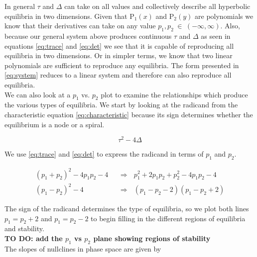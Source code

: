 \documentclass{article}
\begin{document}
In general $\tau$ and $\Delta$ can take on all values and collectively
describe all hyperbolic equilibria in two dimensions. Given that $\text{P}_1(x)$ and
$\text{P}_2(y)$ are polynomials we know that their derivatives can take on any
value $p_1,p_2 \hspace{3pt} \in \hspace{3pt} (-\infty,\infty)$. Also,
because our general system above produces continuous $\tau$ and
$\Delta$ as seen in equations \ref{eq:trace} and \ref{eq:det}  we see that it is capable of reproducing all equilibria in two
dimensions. Or in simpler terms, we know that two linear polynomials are sufficient to
reproduce any equilibria. The form presented in \ref{eq:system} reduces to a
linear system and therefore can also reproduce all equilibria. \\

We can also look at a $p_1$ vs. $p_2$ plot to examine the relationships which
produce the various types of equilibria. We start by looking at the radicand
from the characteristic equation \ref{eq:characteristic} because its sign
determines whether the equilibrium is a node or a spiral.

\begin{equation}
    \tau^2-4\Delta \label{eq:radicand}
\end{equation}

\noindent We use \ref{eq:trace} and \ref{eq:det} to express the radicand in terms of $p_1$
and $p_2$.

\begin{align}
    (p_1+p_2)^2-4p_1p_2-4 \hspace{8pt} 
    & \Rightarrow \hspace{8pt} p_1^2+2p_1p_2+p_2^2-4p_1p_2-4 \nonumber \\
    (p_1-p_2)^2-4 \hspace{8pt} & \Rightarrow \hspace{8pt} 
    (p_1-p_2-2)(p_1-p_2+2) \nonumber
\end{align}

\noindent The sign of the radicand determines the type of equilibria, so we plot
both lines $p_1=p_2+2$ and $p_1=p_2-2$ to begin filling in the different regions of
equilibria and stability. \\


\textbf{TO DO: add the $p_1$ vs $p_2$ plane showing regions of
stability} \\

The slopes of nullclines in phase space are given by
\end{document}
